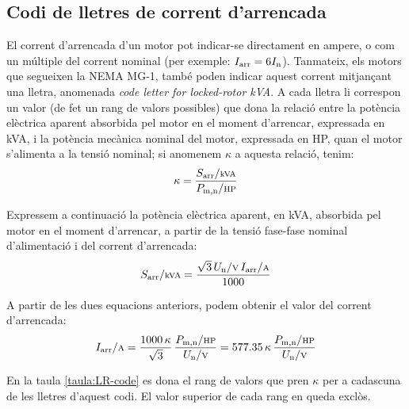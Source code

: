 \subsection{Codi de lletres de corrent d'arrencada}

El corrent d'arrencada d'un motor pot indicar-se directament en ampere, o com un múltiple del corrent nominal (per exemple: $I_\mathrm{arr} = 6 I_\mathrm{n}$). Tanmateix, els motors que segueixen la NEMA MG-1, també poden indicar aquest corrent mitjançant una lletra, anomenada \textit{code letter for locked-rotor kVA}. A cada lletra li correspon un valor (de fet un rang de valors possibles) que dona la relació entre la potència elèctrica aparent absorbida pel motor en el moment d'arrencar, expressada en kVA, i la potència mecànica nominal del motor, expressada en HP, quan el motor s'alimenta a la tensió nominal; si anomenem $\kappa$ a aquesta relació, tenim:
\begin{equation}
    \kappa = \frac{S\ped{arr}/{\scriptstyle\unit{kVA}}}{P\ped{m,n}/{\scriptstyle \unit{HP}}}
\end{equation}

Expressem a continuació la potència elèctrica aparent, en kVA, absorbida pel motor en el moment d'arrencar, a partir de la tensió fase-fase nominal d'alimentació i del corrent d'arrencada:
\begin{equation}
    S\ped{arr}/{\scriptstyle \unit{kVA}} = \frac{\sqrt{3}\,U\ped{n}/{\scriptstyle \unit{V}}\,I\ped{arr}/{\scriptstyle \unit{A}}}{1000}
\end{equation}

A partir de les dues equacions anteriors, podem obtenir el valor del corrent d'arrencada:
\begin{equation}
    I\ped{arr}/{\scriptstyle \unit{A}} = \frac{1000 \,\kappa}{\sqrt{3}} \,\frac{P\ped{m,n}/{\scriptstyle \unit{HP}}}{U\ped{n}/{\scriptstyle \unit{V}}} = \num{577,35}\,\kappa\,\frac{P\ped{m,n}/{\scriptstyle \unit{HP}}}{U\ped{n}/{\scriptstyle \unit{V}}}\label{eq:LR-code}
\end{equation}

En la taula \vref{taula:LR-code} es dona el rang de valors que pren $\kappa$ per a cadascuna de les lletres d'aquest codi. El valor superior de cada rang en queda exclòs.

